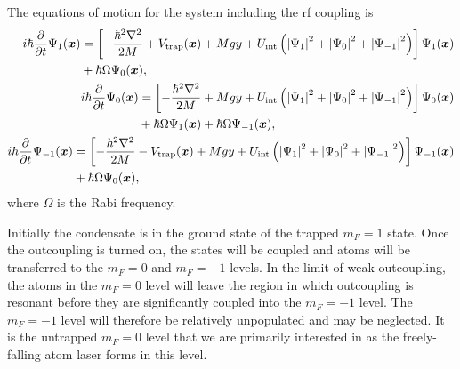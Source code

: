 The equations of motion for the system including the rf coupling is
\begin{subequations}
    \label{BackgroundTheory:AtomLaserF1}
    \begin{align}
        \begin{split}
            i \hbar \frac{\partial}{\partial t} \Psi_1(\vect{x}) &= \left[ - \frac{\hbar^2 \nabla^2}{2 M} + V_\text{trap}(\vect{x}) + M g y + U_\text{int}\left(\abs{\Psi_1}^2 + \abs{\Psi_0}^2 + \abs{\Psi_{-1}}^2\right)\right] \Psi_1(\vect{x})\\
            & + \hbar \Omega \Psi_0(\vect{x}),
        \end{split}\\
        \begin{split}
            i \hbar \frac{\partial}{\partial t} \Psi_0(\vect{x}) &= \left[ - \frac{\hbar^2 \nabla^2}{2 M} + M g y + U_\text{int} \left(\abs{\Psi_1}^2 + \abs{\Psi_0}^2 + \abs{\Psi_{-1}}^2\right)\right] \Psi_0(\vect{x})\\
            & + \hbar \Omega \Psi_1(\vect{x}) + \hbar \Omega \Psi_{-1}(\vect{x}),
        \end{split}\\
        \begin{split}
            i \hbar \frac{\partial}{\partial t} \Psi_{-1}(\vect{x}) &= \left[ - \frac{\hbar^2 \nabla^2}{2 M} - V_\text{trap}(\vect{x}) + M g y + U_\text{int}\left(\abs{\Psi_1}^2 + \abs{\Psi_0}^2 + \abs{\Psi_{-1}}^2\right)\right] \Psi_{-1}(\vect{x})\\
            & + \hbar \Omega \Psi_0(\vect{x}),
        \end{split}
    \end{align}
\end{subequations}
where $\Omega$ is the Rabi frequency.

Initially the condensate is in the ground state of the trapped $m_F=1$ state.  Once the outcoupling is turned on, the states will be coupled and atoms will be transferred to the $m_F=0$ and $m_F=-1$ levels.  In the limit of weak outcoupling, the atoms in the $m_F=0$ level will leave the region in which outcoupling is resonant before they are significantly coupled into the $m_F=-1$ level.  The $m_F=-1$ level will therefore be relatively unpopulated and may be neglected.  It is the untrapped $m_F=0$ level that we are primarily interested in as the freely-falling atom laser forms in this level.

